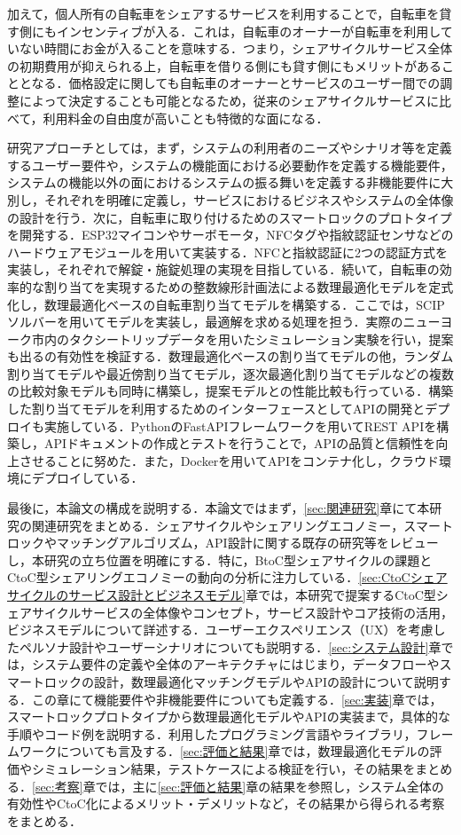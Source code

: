         \par 加えて，個人所有の自転車をシェアするサービスを利用することで，自転車を貸す側にもインセンティブが入る．これは，自転車のオーナーが自転車を利用していない時間にお金が入ることを意味する．つまり，シェアサイクルサービス全体の初期費用が抑えられる上，自転車を借りる側にも貸す側にもメリットがあることとなる．価格設定に関しても自転車のオーナーとサービスのユーザー間での調整によって決定することも可能となるため，従来のシェアサイクルサービスに比べて，利用料金の自由度が高いことも特徴的な面になる．
        \par 研究アプローチとしては，まず，システムの利用者のニーズやシナリオ等を定義するユーザー要件や，システムの機能面における必要動作を定義する機能要件，システムの機能以外の面におけるシステムの振る舞いを定義する非機能要件に大別し，それぞれを明確に定義し，サービスにおけるビジネスやシステムの全体像の設計を行う．次に，自転車に取り付けるためのスマートロックのプロトタイプを開発する．ESP32マイコンやサーボモータ，NFCタグや指紋認証センサなどのハードウェアモジュールを用いて実装する．NFCと指紋認証に2つの認証方式を実装し，それぞれで解錠・施錠処理の実現を目指している．続いて，自転車の効率的な割り当てを実現するための整数線形計画法による数理最適化モデルを定式化し，数理最適化ベースの自転車割り当てモデルを構築する．ここでは，SCIPソルバーを用いてモデルを実装し，最適解を求める処理を担う．実際のニューヨーク市内のタクシートリップデータを用いたシミュレーション実験を行い，提案も出るの有効性を検証する．数理最適化ベースの割り当てモデルの他，ランダム割り当てモデルや最近傍割り当てモデル，逐次最適化割り当てモデルなどの複数の比較対象モデルも同時に構築し，提案モデルとの性能比較も行っている．構築した割り当てモデルを利用するためのインターフェースとしてAPIの開発とデプロイも実施している．PythonのFastAPIフレームワークを用いてREST APIを構築し，APIドキュメントの作成とテストを行うことで，APIの品質と信頼性を向上させることに努めた．また，Dockerを用いてAPIをコンテナ化し，クラウド環境にデプロイしている．
        \par 最後に，本論文の構成を説明する．本論文ではまず，\ref{sec:関連研究}章にて本研究の関連研究をまとめる．シェアサイクルやシェアリングエコノミー，スマートロックやマッチングアルゴリズム，API設計に関する既存の研究等をレビューし，本研究の立ち位置を明確にする．特に，BtoC型シェアサイクルの課題とCtoC型シェアリングエコノミーの動向の分析に注力している．\ref{sec:CtoCシェアサイクルのサービス設計とビジネスモデル}章では，本研究で提案するCtoC型シェアサイクルサービスの全体像やコンセプト，サービス設計やコア技術の活用，ビジネスモデルについて詳述する．ユーザーエクスペリエンス（UX）を考慮したペルソナ設計やユーザーシナリオについても説明する．\ref{sec:システム設計}章では，システム要件の定義や全体のアーキテクチャにはじまり，データフローやスマートロックの設計，数理最適化マッチングモデルやAPIの設計について説明する．この章にて機能要件や非機能要件についても定義する．\ref{sec:実装}章では，スマートロックプロトタイプから数理最適化モデルやAPIの実装まで，具体的な手順やコード例を説明する．利用したプログラミング言語やライブラリ，フレームワークについても言及する．\ref{sec:評価と結果}章では，数理最適化モデルの評価やシミュレーション結果，テストケースによる検証を行い，その結果をまとめる．\ref{sec:考察}章では，主に\ref{sec:評価と結果}章の結果を参照し，システム全体の有効性やCtoC化によるメリット・デメリットなど，その結果から得られる考察をまとめる．


